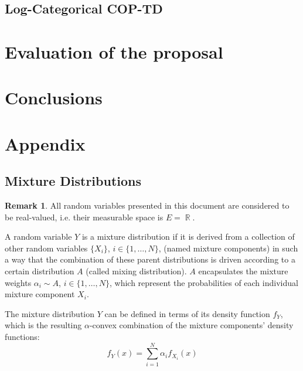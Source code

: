 \documentclass[12pt,a4paper,openright,twoside]{article}
\DeclareMathOperator*{\R}{\mathbb{R}}
\numberwithin{equation}{section}
\theoremstyle{definition}
\newtheorem*{remark}{Remark}
\theoremstyle{remark}
\theoremstyle{plain}
\begin{document}
\subsection{Log-Categorical COP-TD}


\newpage 

\thispagestyle{plain}
\section{Evaluation of the proposal}



\newpage

\thispagestyle{plain}
\section{Conclusions}


\newpage

\appendix
\pagestyle{fancy}
\renewcommand{\sectionmark}[1]{\markboth{#1}{}}
\renewcommand{\subsectionmark}[1]{\markright{\thesubsection.\quad #1}}

\thispagestyle{plain}
\section*{Appendix}
\sectionmark{Appendix}

\setcounter{section}{1}
\setcounter{theorem}{0}
\setcounter{definition}{0}
\setcounter{equation}{0}

\subsection{Mixture Distributions}

\begin{remark}
All random variables presented in this document are considered to be real-valued, i.e. their measurable space is $E= \R$. 
\end{remark}

A random variable $Y$ is a mixture distribution if it is derived from a collection of other random variables $\{X_i\}$, $i\in \{1, \dots, N\}$, (named mixture components) in such a way that the combination of these parent distributions is driven according to a certain distribution $A$ (called mixing distribution). $A$ encapsulates the mixture weights $\alpha_i \sim A$, $i\in \{1, \dots, N\}$, which represent the probabilities of each individual mixture component $X_i$. 

The mixture distribution $Y$ can be defined in terms of its density function $f_Y$, which is the resulting $\alpha$-convex combination of the mixture components' density functions:
\begin{equation} \label{mixtureDef}
    f_{Y} (x) = \sum_{i=1}^{N} \alpha _i f_{X_i}(x)
\end{equation}
\end{document}

